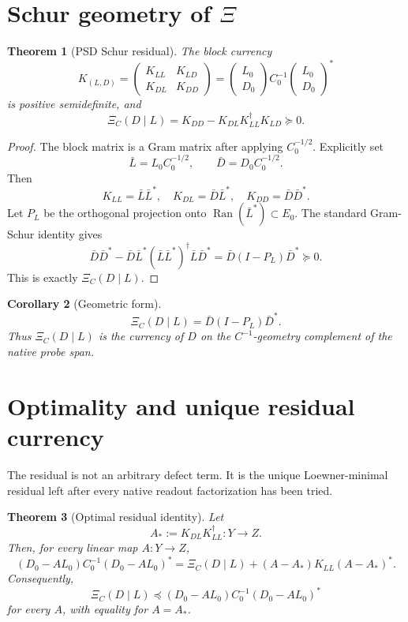 \documentclass[11pt]{article}
\newtheorem{theorem}{Theorem}[section]
\newtheorem{corollary}[theorem]{Corollary}
\newcommand{\Ran}{\operatorname{Ran}}
\begin{document}
\section{Schur geometry of $\Xi$}

\begin{theorem}[PSD Schur residual]
The block currency
\[
K_{(L,D)}=
\begin{pmatrix}
K_{LL}&K_{LD}\\
K_{DL}&K_{DD}
\end{pmatrix}
=
\begin{pmatrix}L_0\\D_0\end{pmatrix}
C_0^{-1}
\begin{pmatrix}L_0\\D_0\end{pmatrix}^*
\]
is positive semidefinite, and
\[
\Xi_C(D\mid L)
=
K_{DD}-K_{DL}K_{LL}^{\dagger}K_{LD}
\succeq0.
\]
\end{theorem}

\begin{proof}
The block matrix is a Gram matrix after applying $C_0^{-1/2}$.  Explicitly set
\[
\bar L=L_0C_0^{-1/2},\qquad \bar D=D_0C_0^{-1/2}.
\]
Then
\[
K_{LL}=\bar L\bar L^*,\quad
K_{DL}=\bar D\bar L^*,\quad
K_{DD}=\bar D\bar D^*.
\]
Let $P_L$ be the orthogonal projection onto $\Ran(\bar L^*)\subset E_0$.  The standard Gram-Schur identity gives
\[
\bar D\bar D^*-\bar D\bar L^*(\bar L\bar L^*)^\dagger\bar L\bar D^*
=
\bar D(I-P_L)\bar D^*
\succeq0.
\]
This is exactly $\Xi_C(D\mid L)$.
\end{proof}

\begin{corollary}[Geometric form]
\[
\boxed{
\Xi_C(D\mid L)=\bar D(I-P_L)\bar D^*.
}
\]
Thus $\Xi_C(D\mid L)$ is the currency of $D$ on the $C^{-1}$-geometry complement of the native probe span.
\end{corollary}

\section{Optimality and unique residual currency}

The residual is not an arbitrary defect term.  It is the unique Loewner-minimal residual left after every native readout factorization has been tried.

\begin{theorem}[Optimal residual identity]
Let
\[
A_*:=K_{DL}K_{LL}^{\dagger}:Y\to Z.
\]
Then, for every linear map $A:Y\to Z$,
\[
\boxed{
(D_0-AL_0)C_0^{-1}(D_0-AL_0)^*
=
\Xi_C(D\mid L)
+(A-A_*)K_{LL}(A-A_*)^*.
}
\]
Consequently,
\[
\Xi_C(D\mid L)
\preceq
(D_0-AL_0)C_0^{-1}(D_0-AL_0)^*
\]
for every $A$, with equality for $A=A_*$.
\end{theorem}
\end{document}
